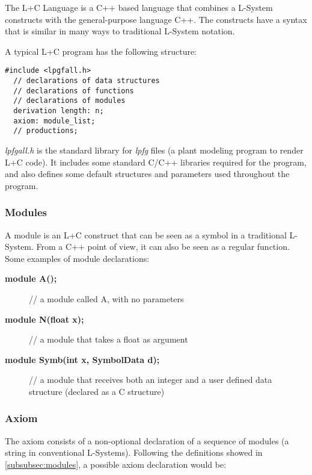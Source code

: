 \documentclass{acmtog}
\begin{document}
The L+C Language \cite{karwowski2003design} is a C++ based language that combines a L-System constructs with the general-purpose language C++. The constructs have a syntax that is similar in many ways to traditional L-System notation.

A typical L+C program has the following structure:

\begin{lstlisting}[label={lst:lc_example}]
  #include <lpgfall.h>
  // declarations of data structures
  // declarations of functions
  // declarations of modules
  derivation length: n;
  axiom: module_list;
  // productions;
\end{lstlisting}

\emph{lpfgall.h} is the standard library for \emph{lpfg} files (a plant modeling program to render L+C code). It includes some standard C/C++ libraries required for the program, and also defines some default structures and parameters used throughout the program.

\subsubsection{Modules}
\label{subsubsec:modules}

A module is an L+C construct that can be seen as a symbol in a traditional L-System. From a C++ point of view, it can also be seen as a regular function. Some examples of module declarations:

\begin{description}
  \item[\textbf{module A();}] // a module called A, with no parameters
  \item[\textbf{module N(float x);}] // a module that takes a float as argument
  \item[\textbf{module Symb(int x, SymbolData d);}] // a module that receives both an integer and a user defined data structure (declared as a C structure)
\end{description}

\subsubsection{Axiom}
\label{subsubsec:axiom}

The axiom consists of a non-optional declaration of a sequence of modules (a string in conventional L-Systems). Following the definitions showed in \autoref{subsubsec:modules}, a possible axiom declaration would be:
\end{document}
